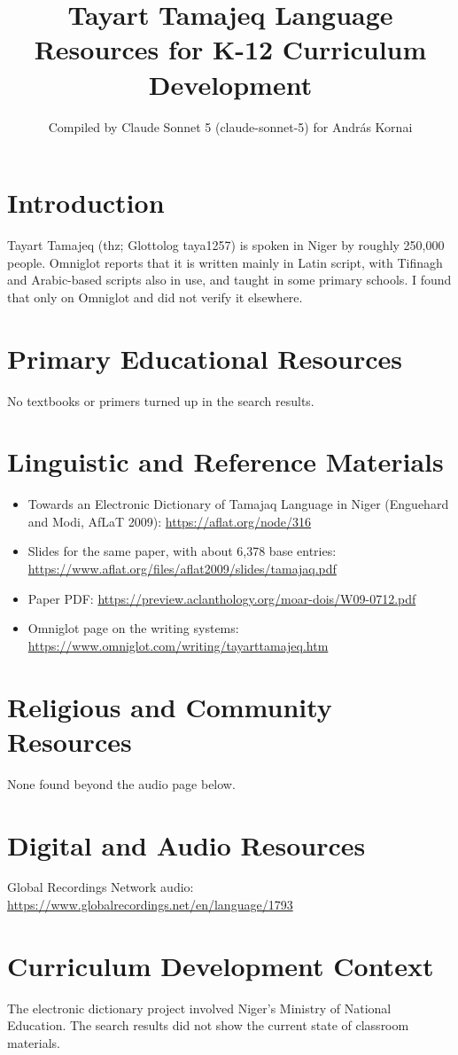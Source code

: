 \documentclass[12pt]{article}
\title{Tayart Tamajeq Language Resources for K-12 Curriculum Development}
\author{Compiled by Claude Sonnet 5 (claude-sonnet-5) for Andr\'as Kornai}
\date{}
\begin{document}
\maketitle
\section{Introduction}
Tayart Tamajeq (thz; Glottolog taya1257) is spoken in Niger by roughly 250,000 people. Omniglot reports that it is written mainly in Latin script, with Tifinagh and Arabic-based scripts also in use, and taught in some primary schools. I found that only on Omniglot and did not verify it elsewhere.
\section{Primary Educational Resources}
No textbooks or primers turned up in the search results.
\section{Linguistic and Reference Materials}
\begin{itemize}
\item Towards an Electronic Dictionary of Tamajaq Language in Niger (Enguehard and Modi, AfLaT 2009): \url{https://aflat.org/node/316}
\item Slides for the same paper, with about 6,378 base entries: \url{https://www.aflat.org/files/aflat2009/slides/tamajaq.pdf}
\item Paper PDF: \url{https://preview.aclanthology.org/moar-dois/W09-0712.pdf}
\item Omniglot page on the writing systems: \url{https://www.omniglot.com/writing/tayarttamajeq.htm}
\end{itemize}
\section{Religious and Community Resources}
None found beyond the audio page below.
\section{Digital and Audio Resources}
Global Recordings Network audio: \url{https://www.globalrecordings.net/en/language/1793}
\section{Curriculum Development Context}
The electronic dictionary project involved Niger's Ministry of National Education. The search results did not show the current state of classroom materials.
\end{document}
